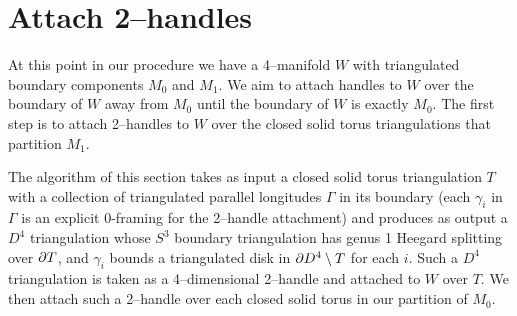 \section{Attach 2--handles}
\label{section:pl-2-handle}

At this point in our procedure we have a 4--manifold $W$ with triangulated boundary components $M_0$ and $M_1$.
We aim to attach handles to $W$ over the boundary of $W$ away from $M_0$ until the boundary of $W$ is exactly $M_0$.
The first step is to attach 2--handles to $W$ over the closed solid torus triangulations that partition $M_1$.

The algorithm of this section takes as input a closed solid torus triangulation $T$ with a collection of triangulated parallel longitudes $\Gamma$ in its boundary (each $\gamma_i$ in $\Gamma$ is an explicit 0-framing for the 2--handle attachment) and produces as output a $D^4$ triangulation whose $S^3$ boundary triangulation has genus 1 Heegard splitting over $\partial T$, and $\gamma_i$ bounds a triangulated disk in $\partial D^4\setminus T$ for each $i$.
Such a $D^4$ triangulation is taken as a 4--dimensional 2--handle and attached to $W$ over $T$.
We then attach such a 2--handle over each closed solid torus in our partition of $M_0$.
